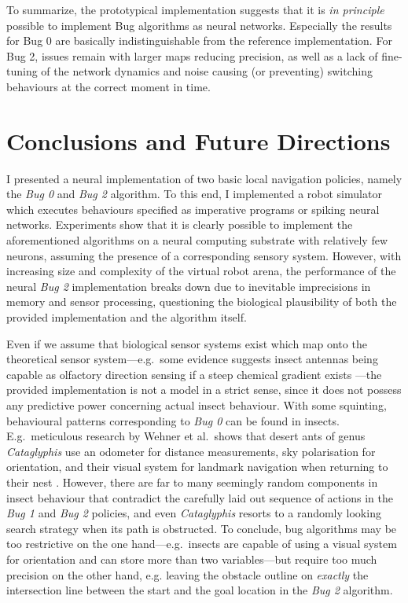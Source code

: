 \documentclass[letterpaper,10pt,conference]{ieeeconf}
\begin{document}
To summarize, the prototypical implementation suggests that it is \emph{in principle} possible to implement Bug algorithms as neural networks. Especially the results for Bug 0 are basically indistinguishable from the reference implementation. For Bug 2, issues remain with larger maps reducing precision, as well as a lack of fine-tuning of the network dynamics and noise causing (or preventing) switching behaviours at the correct moment in time.

\section{Conclusions and Future Directions}
\label{sec:conclusion}

I presented a neural implementation of two basic local navigation policies, namely the \emph{Bug 0} and \emph{Bug 2} algorithm. To this end, I implemented a robot simulator which executes behaviours specified as imperative programs or spiking neural networks. Experiments show that it is clearly possible to implement the aforementioned algorithms on a neural computing substrate with relatively few neurons, assuming the presence of a corresponding sensory system. However, with increasing size and complexity of the virtual robot arena, the performance of the neural \emph{Bug 2} implementation breaks down due to inevitable imprecisions in memory and sensor processing, questioning the biological plausibility of both the provided implementation and the algorithm itself.

Even if we assume that biological sensor systems exist which map onto the theoretical sensor system---e.g.~some evidence suggests insect antennas being capable as olfactory direction sensing if a steep chemical gradient exists \cite{schneider1964insect}---the provided implementation is not a model in a strict sense, since it does not possess any predictive power concerning actual insect behaviour. With some squinting, behavioural patterns corresponding to \emph{Bug 0} can be found in insects. E.g.~meticulous research by Wehner et al.~shows that desert ants of genus \emph{Cataglyphis} use an odometer for distance measurements, sky polarisation for orientation, and their visual system for landmark navigation when returning to their nest \cite{wehner1995pathintegration,wehner2003desert,wehner2004distance}. However, there are far to many seemingly random components in insect behaviour that contradict the carefully laid out sequence of actions in the \emph{Bug 1} and \emph{Bug 2} policies, and even \emph{Cataglyphis} resorts to a randomly looking search strategy when its path is obstructed. To conclude, bug algorithms may be too restrictive on the one hand---e.g.~insects are capable of using a visual system for orientation and can store more than two variables---but require too much precision on the other hand, e.g. leaving the obstacle outline on \emph{exactly} the intersection line between the start and the goal location in the \emph{Bug 2} algorithm.
\end{document}
